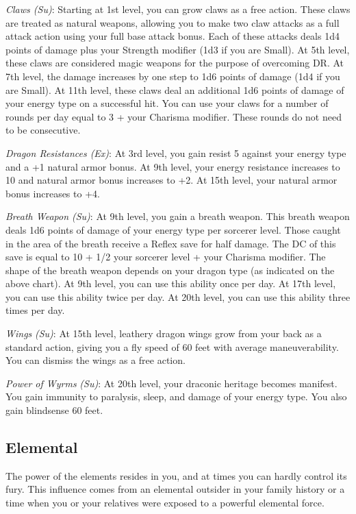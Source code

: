 \textit{Claws (Su)}: Starting at 1st level, you can grow claws as a free action. These claws are treated as natural weapons, allowing you to make two claw attacks as a full attack action using your full base attack bonus. Each of these attacks deals 1d4 points of damage plus your Strength modifier (1d3 if you are Small). At 5th level, these claws are considered magic weapons for the purpose of overcoming DR. At 7th level, the damage increases by one step to 1d6 points of damage (1d4 if you are Small). At 11th level, these claws deal an additional 1d6 points of damage of your energy type on a successful hit. You can use your claws for a number of rounds per day equal to 3 + your Charisma modifier. These rounds do not need to be consecutive.
				
\textit{Dragon Resistances (Ex)}: At 3rd level, you gain resist 5 against your energy type and a +1 natural armor bonus. At 9th level, your energy resistance increases to 10 and natural armor bonus increases to +2. At 15th level, your natural armor bonus increases to +4.
				
\textit{Breath Weapon (Su)}: At 9th level, you gain a breath weapon. This breath weapon deals 1d6 points of damage of your energy type per sorcerer level. Those caught in the area of the breath receive a Reflex save for half damage. The DC of this save is equal to 10 + 1/2 your sorcerer level + your Charisma modifier. The shape of the breath weapon depends on your dragon type (as indicated on the above chart). At 9th level, you can use this ability once per day. At 17th level, you can use this ability twice per day. At 20th level, you can use this ability three times per day.
				
\textit{Wings} \textit{(Su)}: At 15th level, leathery dragon wings grow from your back as a standard action, giving you a fly speed of 60 feet with average maneuverability. You can dismiss the wings as a free action.
				
\textit{Power of Wyrms} \textit{(Su)}: At 20th level, your draconic heritage becomes manifest. You gain immunity to paralysis, sleep, and damage of your energy type. You also gain blindsense 60 feet.
				
\subsection{Elemental}

				
The power of the elements resides in you, and at times you can hardly control its fury. This influence comes from an elemental outsider in your family history or a time when you or your relatives were exposed to a powerful elemental force.
				
